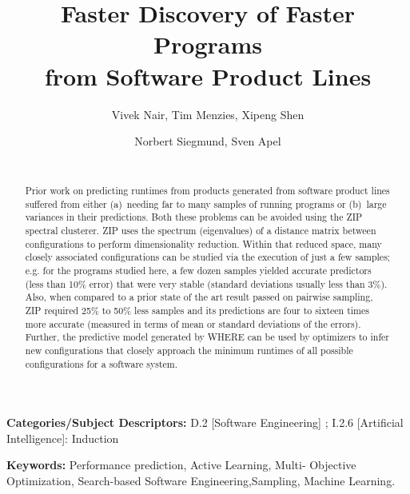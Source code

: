 \documentclass{sig-alternative}
\begin{document}
\title{Faster Discovery  of Faster Programs \\from Software Product Lines} 
\author{
        \alignauthor Vivek Nair, Tim Menzies, Xipeng Shen 
    \and  
        \alignauthor Norbert Siegmund, Sven Apel \\
        \\
       }

\maketitle 
\thispagestyle{plain}
\pagestyle{plain}
\begin{abstract}
Prior work on predicting runtimes from products generated from
software product lines suffered from either (a)~needing far to many samples
of running programs or (b)~large variances in their predictions.
Both these problems can be avoided using the ZIP
spectral clusterer. 
ZIP  uses the spectrum (eigenvalues) of a distance matrix
between configurations to perform dimensionality reduction. Within that
reduced space, many closely associated configurations can be studied
via the execution of just a few samples; e.g. for the programs studied
here, a few dozen samples yielded accurate predictors (less than 10\% error)
that were very stable (standard deviations usually less than 3\%).  
Also, when compared to a prior state of the art result passed on
pairwise sampling, ZIP
 required  
25\% to 50\% less samples 
and its predictions are   four to sixteen times more accurate (measured in terms of mean or
standard deviations  of the errors).  Further, the predictive model generated by
WHERE can be used by optimizers to infer new configurations that closely
approach the minimum runtimes of all possible configurations for a software system.
\end{abstract}

\vspace{1mm}
\noindent
{\bf Categories/Subject Descriptors:} 
D.2 [Software Engineering] ;
I.2.6 [Artificial Intelligence]: Induction

 
\vspace{1mm}
\noindent

{\bf Keywords:} Performance prediction, Active Learning, 
Multi- Objective Optimization,
Search-based Software Engineering,Sampling, Machine Learning.
\end{document}
